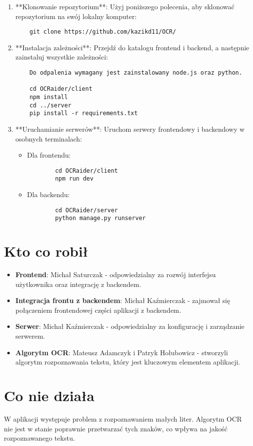 \documentclass{article}
\begin{document}
\begin{enumerate}
    \item **Klonowanie repozytorium**: Użyj poniższego polecenia, aby sklonować repozytorium na swój lokalny komputer:
    \begin{verbatim}
    git clone https://github.com/kazikd11/OCR/
    \end{verbatim}
    
    \item **Instalacja zależności**: Przejdź do katalogu frontend i backend, a następnie zainstaluj wszystkie zależności:
    \begin{verbatim}
    Do odpalenia wymagany jest zainstalowany node.js oraz python.
    
    cd OCRaider/client
    npm install
    cd ../server
    pip install -r requirements.txt
    \end{verbatim}
    
    \item **Uruchamianie serwerów**: Uruchom serwery frontendowy i backendowy w osobnych terminalach:
    \begin{itemize}
        \item Dla frontendu:
        \begin{verbatim}
        cd OCRaider/client
        npm run dev
        \end{verbatim}
        
        \item Dla backendu:
        \begin{verbatim}
        cd OCRaider/server
        python manage.py runserver
        \end{verbatim}
    \end{itemize}
\end{enumerate}

\section{Kto co robił}
\begin{itemize}
    \item \textbf{Frontend}: Michał Saturczak - odpowiedzialny za rozwój interfejsu użytkownika oraz integrację z backendem.
    \item \textbf{Integracja frontu z backendem}: Michał Kaźmierczak - zajmował się połączeniem frontendowej części aplikacji z backendem.
    \item \textbf{Serwer}: Michał Kaźmierczak - odpowiedzialny za konfigurację i zarządzanie serwerem.
    \item \textbf{Algorytm OCR}: Mateusz Adamczyk i Patryk Hołubowicz - stworzyli algorytm rozpoznawania tekstu, który jest kluczowym elementem aplikacji.
\end{itemize}

\section{Co nie działa}
W aplikacji występuje problem z rozpoznawaniem małych liter. Algorytm OCR nie jest w stanie poprawnie przetwarzać tych znaków, co wpływa na jakość rozpoznawanego tekstu.
\end{document}
